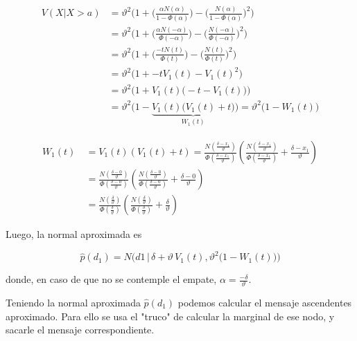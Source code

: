\documentclass[11pt,twoside,spanish]{report} %
\begin{document}
\begin{equation}\label{eq:variance_aprox_}
	\begin{split}
		V(X|  X > a) & = \vartheta^2 \Bigg( 1 + \bigg(\frac{\alpha N(\alpha)}{1 - \Phi(\alpha) }\bigg) - \bigg(\frac{N(\alpha)}{1 - \Phi(\alpha) }\bigg)^2 \Bigg) \\
		& = \vartheta^2 \Bigg( 1 + \bigg(\frac{\alpha N(-\alpha)}{\Phi(-\alpha) }\bigg) - \bigg(\frac{N(-\alpha)}{\Phi(-\alpha) }\bigg)^2 \Bigg) \\
		& = \vartheta^2 \Bigg( 1 + \bigg(\frac{-t N(t)}{\Phi(t) }\bigg) - \bigg(\frac{N(t)}{\Phi(t) }\bigg)^2 \Bigg) \\
		& = \vartheta^2 \Big( 1 +  -t V_1(t) - V_1(t)^2 \Big) \\
		& = \vartheta^2 \Big( 1 + V_1(t) \big(-t  - V_1(t)\big) \Big)  \\
		& = \vartheta^2 \Big( 1 - \underbrace{V_1(t) \big(V_1(t) + t \big)}_{W_1(t)} \Big)  = \vartheta^2 \big( 1 - W_1(t) \big)
	\end{split}
\end{equation}

\begin{equation}
	\begin{split}
		W_1(t)\ &= V_1(t)(V_1(t) + t) = \frac{N(\frac{\delta-x_1}{\vartheta})}{\Phi(\frac{\delta-x_1}{\vartheta})}\left(\frac{N(\frac{\delta-x_1}{\vartheta})}{\Phi(\frac{\delta-x_1}{\vartheta})}+ \frac{\delta -x_1}{\vartheta}\right) \\
		&=\frac{N(\frac{\delta-0}{\vartheta})}{\Phi(\frac{\delta-0}{\vartheta})}\left(\frac{N(\frac{\delta-0}{\vartheta})}{\Phi(\frac{\delta-0}{\vartheta})}+ \frac{\delta -0}{\vartheta}\right)\\
		&=\frac{N(\frac{\delta}{\vartheta})}{\Phi(\frac{\delta}{\vartheta})}\left(\frac{N(\frac{\delta}{\vartheta})}{\Phi(\frac{\delta}{\vartheta})}+ \frac{\delta}{\vartheta}\right)
	\end{split}
\end{equation}

Luego, la normal aproximada es

\begin{equation}\label{eq:p*_d}
	\widehat{p}(d_1) = N\Bigg(d1 \,  \bigg| \,  \delta + \vartheta \, V_1(t) ,  \vartheta^2 \big( 1 - W_1(t) \big)  \Bigg)
\end{equation}

donde, en caso de que no se contemple el empate, $\alpha=\frac{-\delta}{\vartheta}$.

Teniendo la normal aproximada $\widehat{p}(d_1)$ podemos calcular el mensaje ascendentes aproximado. Para ello se usa el "truco" de calcular la marginal de ese nodo, y sacarle el mensaje correspondiente.
\end{document}
